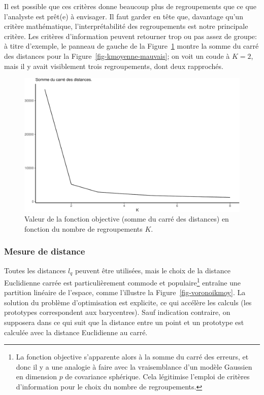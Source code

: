 \documentclass[
  11pt,
  letterpaper,
]{scrbook}
\theoremstyle{definition}
\theoremstyle{remark}
\begin{document}
Il est possible que ces critères donne beaucoup plus de regroupements
que ce que l'analyste est prêt(e) à envisager. Il faut garder en tête
que, davantage qu'un critère mathématique, l'interprétabilité des
regroupements est notre principale critère. Les critères d'information
peuvent retourner trop ou pas assez de groupe: à titre d'exemple, le
panneau de gauche de la Figure~\ref{fig-coudekmoy} montre la somme du
carré des distances pour la Figure~\ref{fig-kmoyenne-mauvais}; on voit
un coude à \(K=2\), mais il y avait visiblement trois regroupements,
dont deux rapprochés.

\begin{figure}[ht!]

{\centering \includegraphics[width=1\textwidth,height=\textheight]{./03-regroupements_files/figure-pdf/fig-coudekmoy-1.pdf}

}

\caption{\label{fig-coudekmoy}Valeur de la fonction objective (somme du
carré des distances) en fonction du nombre de regroupements \(K\).}

\end{figure}

\hypertarget{mesure-de-distance}{%
\subsubsection*{Mesure de distance}\label{mesure-de-distance}}

Toutes les distances \(l_q\) peuvent être utilisées, mais le choix de la
distance Euclidienne carrée est particulièrement commode et
populaire\footnote{La fonction objective s'apparente alors à la somme du
  carré des erreurs, et donc il y a une analogie à faire avec la
  vraisemblance d'un modèle Gaussien en dimension \(p\) de covariance
  sphérique. Cela légitimise l'emploi de critères d'information pour le
  choix du nombre de regroupements.} entraîne une partition linéaire de
l'espace, comme l'illustre la Figure~\ref{fig-voronoikmoy}. La solution
du problème d'optimisation est explicite, ce qui accélère les calculs
(les prototypes correspondent aux barycentres). Sauf indication
contraire, on supposera dans ce qui suit que la distance entre un point
et un prototype est calculée avec la distance Euclidienne au carré.
\end{document}
